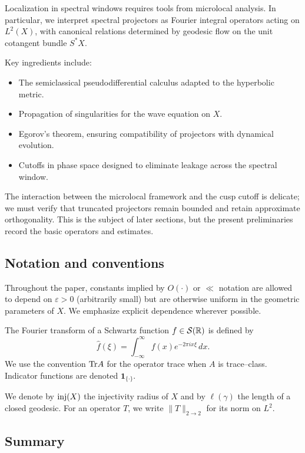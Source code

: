 Localization in spectral windows requires tools from microlocal analysis. In particular, we interpret spectral projectors as Fourier integral operators acting on $L^2(X)$, with canonical relations determined by geodesic flow on the unit cotangent bundle $S^*X$.

Key ingredients include:

\begin{itemize}
  \item The semiclassical pseudodifferential calculus adapted to the hyperbolic metric.
  \item Propagation of singularities for the wave equation on $X$.
  \item Egorov’s theorem, ensuring compatibility of projectors with dynamical evolution.
  \item Cutoffs in phase space designed to eliminate leakage across the spectral window.
\end{itemize}

The interaction between the microlocal framework and the cusp cutoff is delicate; we must verify that truncated projectors remain bounded and retain approximate orthogonality. This is the subject of later sections, but the present preliminaries record the basic operators and estimates.

\subsection{Notation and conventions}\label{subsec:notation}

Throughout the paper, constants implied by $O(\cdot)$ or $\ll$ notation are allowed to depend on $\varepsilon>0$ (arbitrarily small) but are otherwise uniform in the geometric parameters of $X$. We emphasize explicit dependence wherever possible.

The Fourier transform of a Schwartz function $f \in \mathcal{S}(\mathbb{R})$ is defined by
\[
\widehat{f}(\xi) = \int_{-\infty}^\infty f(x) e^{-2\pi i x \xi}\, dx.
\]
We use the convention $\mathrm{Tr} A$ for the operator trace when $A$ is trace–class. Indicator functions are denoted $\mathbf{1}_{\{\cdot\}}$.

We denote by $\mathrm{inj}(X)$ the injectivity radius of $X$ and by $\ell(\gamma)$ the length of a closed geodesic. For an operator $T$, we write $\|T\|_{2\to2}$ for its norm on $L^2$.

\subsection{Summary}\label{subsec:summary}


